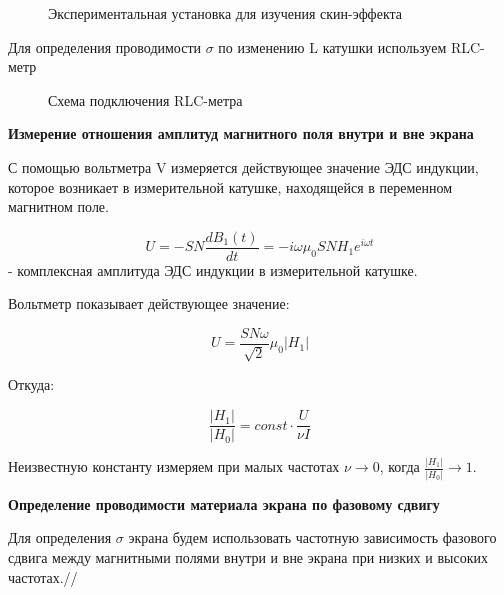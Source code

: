 \documentclass[a4paper,12pt]{article}
\begin{document}
\begin{figure}[htp]
\caption{Экспериментальная установка для изучения скин-эффекта}
\end{figure}

Для определения проводимости $\sigma$ по изменению L катушки используем RLC-метр 

\begin{figure}[htp]
\caption{Схема подключения RLC-метра}
\end{figure}

\par\textbf{Измерение отношения амплитуд магнитного поля внутри и вне экрана}

С помощью вольтметра V измеряется действующее значение ЭДС индукции, которое возникает в измерительной катушке, находящейся в переменном магнитном поле. 

$$U = -SN\frac{dB_1(t)}{dt} = -i\omega {\mu}_0SNH_1e^{i\omega t}$$ - комплексная амплитуда ЭДС индукции в измерительной катушке. 

Вольтметр показывает действующее значение: 

$$ U = \frac{SN\omega}{\sqrt{2}}{\mu}_0|H_1|$$

Откуда:

$$ \frac{|H_1|}{|H_0|} = const\cdot\frac{U}{\nu I}  $$

Неизвестную константу измеряем при малых частотах $\nu \rightarrow 0$, когда $\frac{|H_1|}{|H_0|} \rightarrow 1$. 

\par\textbf{Определение проводимости материала экрана по фазовому сдвигу}

Для определения $\sigma$ экрана будем использовать частотную зависимость фазового сдвига между магнитными полями внутри и вне экрана при низких и высоких частотах.//
\end{document}
